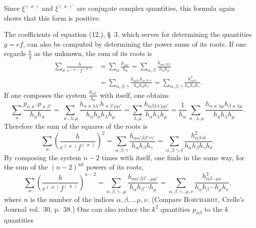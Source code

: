 \documentclass[11pt]{article}
\begin{document}
Since $\xi^{(\varkappa)}$ and $\xi^{(\varkappa)'}$ are conjugate complex quantities, this formula again shows that this form is positive.

The coefficients of equation (12.), \S~3, which serves for determining the quantities $g=ef$, can also be computed by determining the power sums of its roots. If one regards $\frac{h}{g}$ as the unknown, the sum of its roots is
\[
\begin{aligned}
\sum_\varkappa \frac{h}{e^{(\varkappa)}f^{(\varkappa)}}
&=\sum_\alpha \frac{p_{\alpha\alpha'}}{h_\alpha}
=\sum_{\alpha,\beta}\frac{h_{\alpha\alpha'\beta\beta'}}{h_\alpha h_\beta} \\
&=\sum_{\alpha,\beta,\gamma}\frac{h_{\alpha\beta\gamma}h_{\alpha'\beta'\gamma'}}{h_\alpha h_\beta h_\gamma}
=\sum_{\alpha,\beta,\gamma}\frac{h_{\alpha\beta\gamma}^{2}}{h_\alpha h_\beta h_\gamma}.
\end{aligned}
\]
If one composes the system $\frac{p_{\alpha\beta'}}{h_\alpha}$ with itself, one obtains
\[
\sum_\varkappa \frac{p_{\alpha\varkappa'}p_{\varkappa\beta'}}{h_\alpha h_\varkappa}
=\sum_{\varkappa,\lambda,\mu}\frac{h_{\alpha\varkappa\lambda\lambda'}h_{\varkappa\beta'\mu\mu'}}{h_\alpha h_\varkappa h_\lambda h_\mu}
=\sum_{\lambda,\mu}\frac{h_{\alpha\beta\lambda\lambda'\mu\mu'}}{h_\alpha h_\lambda h_\mu}
=\frac{1}{h_\alpha}\sum_{\varkappa,\lambda,\mu}\frac{h_{\alpha\varkappa\lambda\mu}h_{\beta\varkappa\lambda\mu}}{h_\varkappa h_\lambda h_\mu}.
\]
Therefore the sum of the squares of the roots is
\[
\sum_\varkappa\left(\frac{h}{e^{(\varkappa)}f^{(\varkappa)}}\right)^2
=\sum_{\alpha,\beta,\gamma}\frac{h_{\alpha\alpha'\beta\beta'\gamma\gamma'}}{h_\alpha h_\beta h_\gamma}
=\sum_{\alpha,\beta,\gamma,\delta}\frac{h_{\alpha\beta\gamma\delta}^{2}}{h_\alpha h_\beta h_\gamma h_\delta}.
\]
By composing the system $n-2$ times with itself, one finds in the same way, for the sum of the $(n-2)^{\text{nd}}$ powers of its roots,
\begin{equation*}\tag{8.}
\sum_\varkappa\left(\frac{h}{e^{(\varkappa)}f^{(\varkappa)}}\right)^{n-2}
=\sum_{\alpha,\beta,\gamma\ldots\mu}\frac{h_{\alpha\alpha'\beta\beta'\ldots\mu\mu'}}{h_\alpha h_\beta\cdots h_\mu}
=\sum_{\alpha,\beta,\gamma\ldots\mu,\nu}\frac{h_{\alpha\beta\cdots\mu\nu}^{2}}{h_\alpha h_\beta\cdots h_\mu h_\nu},
\end{equation*}
where $n$ is the number of the indices $\alpha,\beta,\ldots\mu,\nu$. (Compare \textsc{Borchardt}, Crelle's Journal vol.~30, p.~38.) One can also reduce the $k^2$ quantities $p_{\alpha\beta}$ to the $k$ quantities
\end{document}
